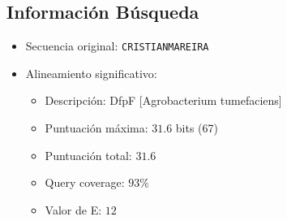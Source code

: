 
\subsection{Información Búsqueda}
\begin{itemize}
	\item Secuencia original: \texttt{CRISTIANMAREIRA}
	\item Alineamiento significativo:
	\begin{itemize}
		\item Descripción: DfpF [Agrobacterium tumefaciens]
		\item Puntuación máxima: $31.6$ bits (67)
		\item Puntuación total: $31.6$ 
		\item Query coverage: $93\%$
		\item Valor de E: $12$
	\end{itemize}
\end{itemize}


